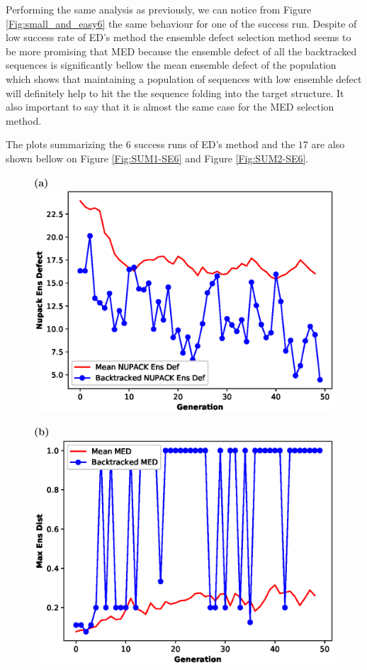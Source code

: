 \documentclass[english,12pt,a4paper]{article}
\theoremstyle{definition}
\begin{document}
Performing the same analysis as previously, we can notice from Figure \ref{Fig:small_and_easy6} the same behaviour for one of the success run. Despite of low success rate of ED's method  the ensemble defect selection method seems to be more promising that MED because the ensemble defect of all the backtracked sequences is significantly bellow the mean ensemble defect of the population which shows that maintaining a population of sequences with  low ensemble defect will definitely help to hit the the sequence folding into the target structure. It also important to say that it is almost the same case for the MED selection method.

The plots summarizing the $6$ success runs of ED's method and the $17$ are also shown bellow on Figure \ref{Fig:SUM1-SE6} and Figure \ref{Fig:SUM2-SE6}.
\begin{figure}[H]

	\hspace{-1.2cm}
	\begin{minipage}{0.60\textwidth}
		\centering
		\textbf{(a)}\label{Fig:Data1}
		\includegraphics[width=.9\linewidth]{images/stat1-48}
	\end{minipage}\hfill
	\begin{minipage}{0.6\textwidth}
		\centering
		
		\textbf{(b)}\label{Fig:Data2}
		\includegraphics[width=.9\linewidth]{images/stat4-48}
	\end{minipage}


\end{figure}
\end{document}
